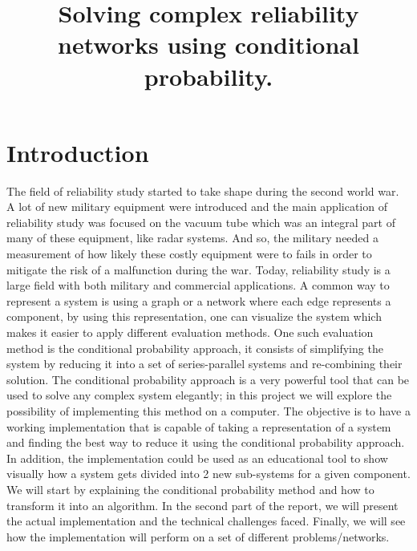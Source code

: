 \documentclass[conference]{IEEEtran}
\begin{document}
\title{Solving complex reliability networks using conditional probability.}

\author{
}

\maketitle

\begin{abstract}

\end{abstract}

\section{Introduction}
The field of reliability study started to take shape during the second world
war. A lot of new military equipment were introduced and the main application
of reliability study was focused on the vacuum tube which was an integral part of many
of these equipment, like radar systems. And so, the military needed a
measurement of how likely these costly equipment were to fails in order to
mitigate the risk of a malfunction during the war. Today, reliability study
is a large field with both military and commercial applications. A common way to
represent a system is using a graph or a network where each edge represents a
component, by using this representation, one can visualize the system which
makes it easier to apply different evaluation methods. One such evaluation
method is the conditional probability approach, it consists of simplifying the
system by reducing it into a set of series-parallel systems and re-combining
their solution. The conditional probability approach is a very powerful tool
that can be used to solve any complex system elegantly; in this project we will
explore the possibility of implementing this method on a computer. The objective
is to have a working implementation that is capable of taking a representation
of a system and finding the best way to reduce it using the conditional probability
approach. In addition, the implementation could be used as an educational tool
to show visually how a system gets divided into 2 new sub-systems for a given
component. We will start by explaining the conditional probability
method and how to transform it into an algorithm. In the second part of the
report, we will present the actual implementation and the technical challenges
faced. Finally, we will see how the implementation will perform on a set of
different problems/networks.\\
\end{document}
